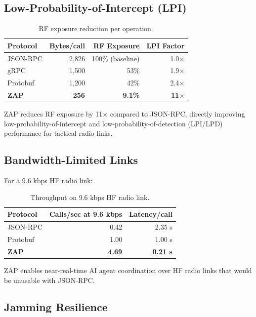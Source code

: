 \documentclass[11pt,letterpaper]{article}
\begin{document}
\subsection{Low-Probability-of-Intercept (LPI)}

\begin{table}[H]
\centering
\begin{tabular}{@{}lrrr@{}}
\toprule
\textbf{Protocol} & \textbf{Bytes/call} & \textbf{RF Exposure} & \textbf{LPI Factor} \\
\midrule
JSON-RPC & 2,826 & 100\% (baseline) & 1.0$\times$ \\
gRPC & 1,500 & 53\% & 1.9$\times$ \\
Protobuf & 1,200 & 42\% & 2.4$\times$ \\
\textbf{ZAP} & \textbf{256} & \textbf{9.1\%} & \textbf{11$\times$} \\
\bottomrule
\end{tabular}
\caption{RF exposure reduction per operation.}
\label{tab:lpi}
\end{table}

ZAP reduces RF exposure by 11$\times$ compared to JSON-RPC, directly improving low-probability-of-intercept and low-probability-of-detection (LPI/LPD) performance for tactical radio links.

\subsection{Bandwidth-Limited Links}

For a 9.6 kbps HF radio link:

\begin{table}[H]
\centering
\begin{tabular}{@{}lrr@{}}
\toprule
\textbf{Protocol} & \textbf{Calls/sec at 9.6 kbps} & \textbf{Latency/call} \\
\midrule
JSON-RPC & 0.42 & 2.35 s \\
Protobuf & 1.00 & 1.00 s \\
\textbf{ZAP} & \textbf{4.69} & \textbf{0.21 s} \\
\bottomrule
\end{tabular}
\caption{Throughput on 9.6 kbps HF radio link.}
\label{tab:hf-radio}
\end{table}

ZAP enables near-real-time AI agent coordination over HF radio links that would be unusable with JSON-RPC.

\subsection{Jamming Resilience}
\end{document}
